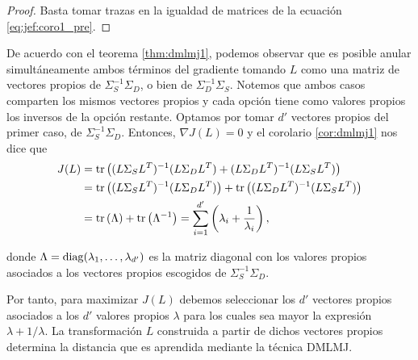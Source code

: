 \begin{proof}
    Basta tomar trazas en la igualdad de matrices de la ecuación \ref{eq:jef:coro1_pre}.

\end{proof}

De acuerdo con el teorema \ref{thm:dmlmj1}, podemos observar que es posible anular simultáneamente ambos términos del gradiente tomando $L$ como una matriz de vectores propios de $\Sigma_S^{-1}\Sigma_D$, o bien de $\Sigma_D^{-1}\Sigma_S$. Notemos que ambos casos comparten los mismos vectores propios y cada opción tiene como valores propios los inversos de la opción restante. Optamos por tomar $d'$ vectores propios del primer caso, de $\Sigma_S^{-1}\Sigma_D$. Entonces, $\nabla J(L) = 0$ y el corolario \ref{cor:dmlmj1} nos dice que
\begin{align*}
    J(L) &= \operatorname{tr}\left( (L\Sigma_S L^T)^{-1} (L\Sigma_D L^T) + (L \Sigma_D L^T)^{-1} (L \Sigma_S L^T) \right) \\
         &= \operatorname{tr}\left( (L\Sigma_S L^T)^{-1} (L\Sigma_D L^T)\right) + \operatorname{tr}\left((L \Sigma_D L^T)^{-1} (L \Sigma_S L^T) \right) \\
         &= \operatorname{tr}\left(\Lambda\right) + \operatorname{tr}\left(\Lambda^{-1}\right) = \sum\limits_{i=1}^{d'} \left( \lambda_i + \frac{1}{\lambda_i} \right),
\end{align*}

donde $\Lambda = \operatorname{diag}(\lambda_1,\dots,\lambda_{d'})$ es la matriz diagonal con los valores propios asociados a los vectores propios escogidos de $\Sigma_S^{-1}\Sigma_D$.

Por tanto, para maximizar $J(L)$ debemos seleccionar los $d'$ vectores propios asociados a los $d'$ valores propios $\lambda$ para los cuales sea mayor la expresión $\lambda + 1/\lambda$. La transformación $L$ construida a partir de dichos vectores propios determina la distancia que es aprendida mediante la técnica DMLMJ.

